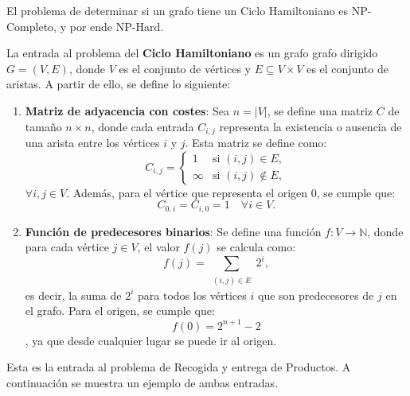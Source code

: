 \documentclass[twocolumn, fontsize=10pt]{article}
\theoremstyle{definition} %
\begin{document}
El problema de determinar si un grafo tiene un Ciclo Hamiltoniano es NP-Completo, y por ende NP-Hard. \cite{GeeksforGeeksHamiltonian}
 
La entrada al problema del \textbf{Ciclo Hamiltoniano}  es un grafo grafo dirigido \( G = (V, E) \), donde \( V \) es el conjunto de vértices y \( E \subseteq V \times V \) es el conjunto de aristas. A partir de ello, se define lo siguiente:

\begin{enumerate}
    \item \textbf{Matriz de adyacencia con costes}: 
    Sea \(n=|V|\), se define una matriz \( C \) de tamaño \( n \times n \), donde cada entrada \( C_{i,j} \) representa la existencia o ausencia de una arista entre los vértices \( i \) y \( j \). Esta matriz se define como:
    \[
    C_{i,j} = 
    \begin{cases} 
    1 & \text{si } (i, j) \in E, \\
    \infty & \text{si } (i, j) \notin E,
    \end{cases}
    \] \(\forall i, j \in V \).
    Además, para el vértice que representa el origen \(0\), se cumple que:
    \[C_{0,i} = C_{i,0} = 1 \quad \forall i \in V.\]

    \item \textbf{Función de predecesores binarios}:  
    Se define una función \( f: V \to \mathbb{N} \), donde para cada vértice \( j \in V \), el valor \( f(j) \) se calcula como:
    \[
    f(j) = \sum_{\substack{(i,j) \in E}} 2^i,
    \]
    es decir, la suma de \( 2^i \) para todos los vértices \( i \) que son predecesores de \( j \) en el grafo. 
    Para el origen, se cumple que:\[f(0)=2^{n+1}-2\], ya que desde cualquier lugar se puede ir al origen.
    
\end{enumerate}

Esta es la entrada al problema de Recogida y entrega de Productos. A continuación se muestra un ejemplo de ambas entradas.
\end{document}
